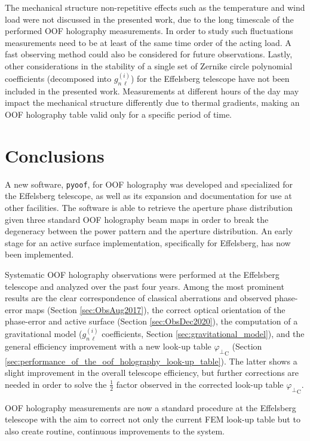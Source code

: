 \documentclass[
    ]
    {aa}
\begin{document}
    The mechanical structure non-repetitive effects such as the temperature and wind load were not discussed in the presented work, due to the long timescale of the performed OOF holography measurements. In order to study such fluctuations measurements need to be at least of the same time order of the acting load. A fast observing method could also be considered for future observations.
    Lastly, other considerations in the stability of a single set of Zernike circle polynomial coefficients (decomposed into $g_{n\,\ell}^{(i)}$) for the Effelsberg telescope have not been included in the presented work. Measurements at different hours of the day may impact the mechanical structure differently due to thermal gradients, making an OOF holography table valid only for a specific period of time.

    \section{Conclusions} 
    \label{sec:conclusions}

    A new software, \texttt{pyoof}, for OOF holography was developed and specialized for the Effelsberg telescope, as well as its expansion and documentation for use at other facilities. The software is able to retrieve the aperture phase distribution given three standard OOF holography beam maps in order to break the degeneracy between the power pattern and the aperture distribution. An early stage for an active surface implementation, specifically for Effelsberg, has now been implemented.

    Systematic OOF holography observations were performed at the Effelsberg telescope and analyzed over the past four years. Among the most prominent results are the clear correspondence of classical aberrations and observed phase-error maps (Section \ref{sec:ObsAug2017}), the correct optical orientation of the phase-error and active surface (Section \ref{sec:ObsDec2020}), the computation of a gravitational model ($g_{n\,\ell}^{(i)}$ coefficients, Section \ref{sec:gravitational_model}), and the general efficiency improvement with a new look-up table ${\varphi_\bot}_\text{C}$ (Section \ref{sec:performance_of_the_oof_holography_look-up_table}).
    The latter shows a slight improvement in the overall telescope efficiency, but further corrections are needed in order to solve the $\frac{1}{2}$ factor observed in the corrected look-up table ${\varphi_\bot}_\text{C}$.

    OOF holography measurements are now a standard procedure at the Effelsberg telescope with the aim to correct not only the current FEM look-up table but to also create routine, continuous improvements to the system.
\end{document}
